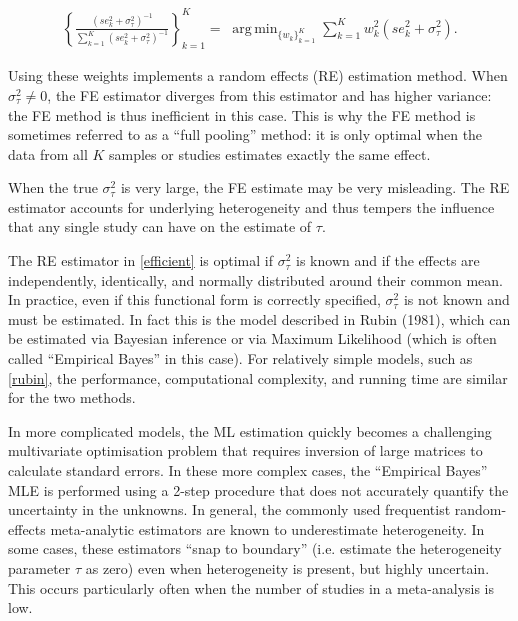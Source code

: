 \documentclass[12pt]{article}
\DeclareMathOperator*{\argmin}{arg\,min}
\begin{document}
 \begin{equation}\label{efficient}
\begin{aligned}
\left\{ \frac{(se^2_k+ \sigma^2_{\tau})^{-1}}{\sum_{k=1}^K(se^2_k+ \sigma^2_{\tau})^{-1}} \right\}_{k=1}^K = \; \argmin_{ \{w_k\}_{k=1}^K  } \sum_{k=1}^{K} w_k^2 (se^2_{k}+ \sigma^2_{\tau}).
\end{aligned}
\end{equation}

Using these weights implements a random effects (RE) estimation method. When $\sigma^2_{\tau} \neq 0$, the FE estimator diverges from this estimator and has higher variance: the FE method is thus inefficient in this case. This is why the FE method is sometimes referred to as a ``full pooling'' method: it is only optimal when the data from all $K$ samples or studies estimates exactly the same effect. 

When the true $\sigma^2_{\tau}$ is very large, the FE estimate may be very misleading. 
The RE estimator accounts for underlying heterogeneity and thus tempers the influence that any single study can have on the estimate of $\tau$.

The RE estimator in \eqref{efficient} is optimal if $\sigma^2_{\tau}$ is known and if the effects are independently, identically, and normally distributed around their common mean. 
In practice, even if this functional form is correctly specified, $\sigma^2_{\tau}$ is not known and must be estimated. In fact this is the model described in Rubin (1981), which can be estimated via Bayesian inference or via Maximum Likelihood (which is often called ``Empirical Bayes'' in this case). For relatively simple models, such as \eqref{rubin}, the performance, computational complexity, and running time are similar for the two methods. 

In more complicated models, the ML estimation quickly becomes a challenging multivariate optimisation problem that requires inversion of large matrices to calculate standard errors. In these more complex cases, the ``Empirical Bayes'' MLE is performed using a 2-step procedure that does not accurately quantify the uncertainty in the unknowns. In general, the commonly used frequentist random-effects meta-analytic estimators are known to underestimate heterogeneity. In some cases, these estimators ``snap to boundary'' (i.e. estimate the heterogeneity parameter $\tau$ as zero) even when heterogeneity is present, but highly uncertain. This occurs particularly often when the number of studies in a meta-analysis is low.
\end{document}
